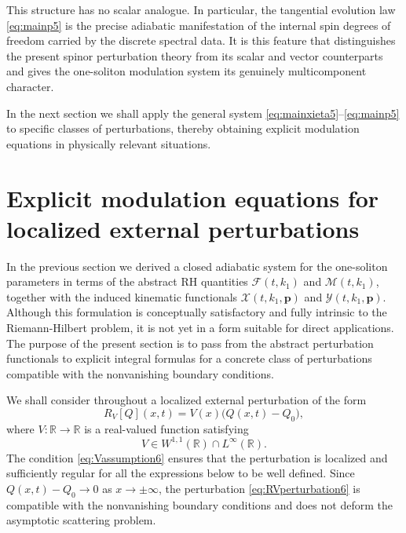 \documentclass[11pt]{amsart}
\theoremstyle{definition}
\numberwithin{equation}{section}
\begin{document}
This structure has no scalar analogue. In particular, the tangential evolution law \eqref{eq:mainp5} is the precise adiabatic manifestation of the internal spin degrees of freedom carried by the discrete spectral data. It is this feature that distinguishes the present spinor perturbation theory from its scalar and vector counterparts and gives the one-soliton modulation system its genuinely multicomponent character.

In the next section we shall apply the general system \eqref{eq:mainxieta5}--\eqref{eq:mainp5} to specific classes of perturbations, thereby obtaining explicit modulation equations in physically relevant situations.
\section{Explicit modulation equations for localized external perturbations}
\label{NVBC_spinor6}
In the previous section we derived a closed adiabatic system for the one-soliton parameters in terms of the abstract RH quantities $\mathcal{F}\left(t, k_1\right)$ and $\mathcal{M}\left(t, k_1\right)$, together with the induced kinematic functionals $\mathcal{X}\left(t, k_1, \mathbf{p}\right)$ and $\mathcal{Y}\left(t, k_1, \mathbf{p}\right)$. Although this formulation is conceptually satisfactory and fully intrinsic to the Riemann-Hilbert problem, it is not yet in a form suitable for direct applications. The purpose of the present section is to pass from the abstract perturbation functionals to explicit integral formulas for a concrete class of perturbations compatible with the nonvanishing boundary conditions.

We shall consider throughout a localized external perturbation of the form
\begin{equation}
R_V[Q](x,t)=V(x)\bigl(Q(x,t)-Q_0\bigr),
\label{eq:RVperturbation6}
\end{equation}
where $V:\mathbb R\to\mathbb R$ is a real-valued function satisfying
\begin{equation}
V \in W^{1,1}(\mathbb R)\cap L^\infty(\mathbb R).
\label{eq:Vassumption6}
\end{equation}
The condition \eqref{eq:Vassumption6} ensures that the perturbation is localized and sufficiently regular for all the expressions below to be well defined. Since $Q(x,t)-Q_0\to 0$ as $x\to\pm\infty$, the perturbation \eqref{eq:RVperturbation6} is compatible with the nonvanishing boundary conditions and does not deform the asymptotic scattering problem.
\end{document}
